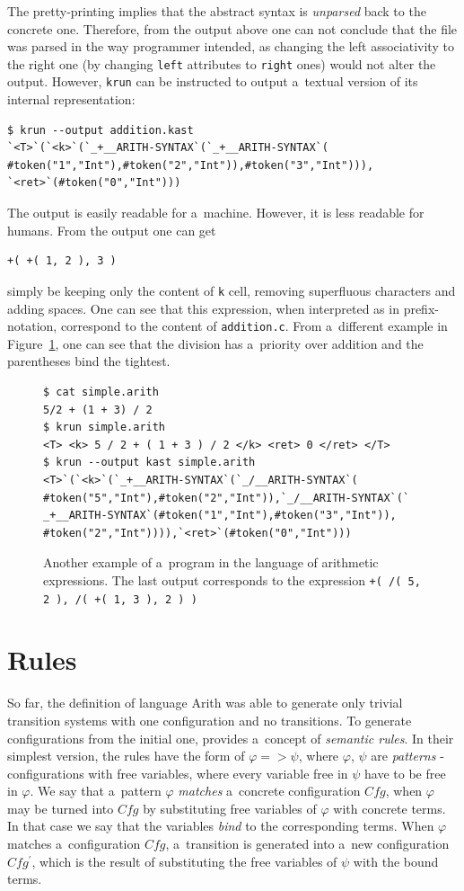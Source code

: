 \documentclass[nolot,nolof,nocover,printed]{fithesis3}
\newcommand{\var}[1]{\mathit{#1}\xspace}
\newcommand{\krun}{\texttt{krun}\xspace}
\begin{document}
The pretty-printing implies that the abstract syntax is \textit{unparsed} back to the concrete one. Therefore, from the output above one can not conclude that the file was parsed in the way programmer intended, as changing the left associativity to the right one (by changing \texttt{left} attributes to \texttt{right} ones) would not alter the output. However, \krun can be instructed to output a~textual version of its internal representation:
\begin{lstlisting}
$ krun --output addition.kast
`<T>`(`<k>`(`_+__ARITH-SYNTAX`(`_+__ARITH-SYNTAX`(
#token("1","Int"),#token("2","Int")),#token("3","Int"))),
`<ret>`(#token("0","Int")))
\end{lstlisting}
The output is easily readable for a~machine. However, it is less readable for humans. From the output one can get
\begin{lstlisting}
+( +( 1, 2 ), 3 )
\end{lstlisting}
simply be keeping only the content of \texttt{k} cell, removing superfluous characters and adding spaces. One can see that this expression, when interpreted as in prefix-notation, correspond to the content of \texttt{addition.c}. From a~different example in Figure~\ref{arithMixed}, one can see that the division has a~priority over addition and the parentheses bind the tightest.


\begin{figure}
\begin{lstlisting}
$ cat simple.arith
5/2 + (1 + 3) / 2
$ krun simple.arith
<T> <k> 5 / 2 + ( 1 + 3 ) / 2 </k> <ret> 0 </ret> </T>
$ krun --output kast simple.arith
<T>`(`<k>`(`_+__ARITH-SYNTAX`(`_/__ARITH-SYNTAX`(
#token("5","Int"),#token("2","Int")),`_/__ARITH-SYNTAX`(`
_+__ARITH-SYNTAX`(#token("1","Int"),#token("3","Int")),
#token("2","Int")))),`<ret>`(#token("0","Int")))
\end{lstlisting}
\caption{Another example of a~program in the language of arithmetic expressions. The last output corresponds to the expression \lstinline|+( /( 5, 2 ), /( +( 1, 3 ), 2 ) )|}
\label{arithMixed}
\end{figure}

\section{Rules}
So far, the definition of language Arith was able to generate only trivial transition systems with one configuration and no transitions. To generate configurations from the initial one, \K provides a~concept of \textit{semantic rules}. In their simplest version, the rules have the form of $\varphi => \psi$, where $\varphi$, $\psi$ are \textit{patterns} - configurations with free variables, where every variable free in $\psi$ have to be free in $\varphi$. We say that a~pattern $\varphi$ \textit{matches} a~concrete configuration $\var{Cfg}$, when $\varphi$ may be turned into $\var{Cfg}$ by substituting free variables of $\varphi$ with concrete terms. In that case we say that the variables \textit{bind} to the corresponding terms. When $\varphi$ matches a~configuration $\var{Cfg}$, a~transition is generated into a~new configuration $\var{Cfg^\prime}$, which is the result of substituting the free variables of $\psi$ with the bound terms.
\end{document}
